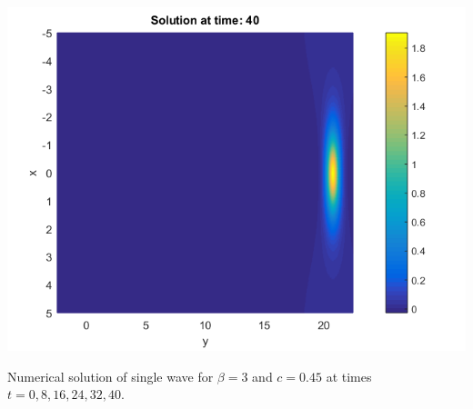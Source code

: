 \documentclass{beamer}
\begin{document}
\begin{frame}
\begin{center}
\begin{minipage}[b]{0.30\linewidth}
	\end{minipage}
	\begin{minipage}[b]{0.30\linewidth}
		 \includegraphics[width=\linewidth]{figures/Solution_bt3_t=40.png}
	\end{minipage}
\end{center}
Numerical solution of single wave for $\beta=3$ and $c = 0.45$ at times $t=0,8,16,24,32,40$.
\end{frame}

\end{document}
